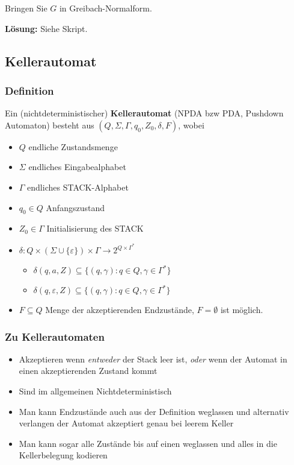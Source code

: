 \documentclass{beamer}
\begin{document}
{\begin{frame}
Bringen Sie $G$ in Greibach-Normalform.

\textbf{Lösung:} Siehe Skript.
\end{frame}

\subsection{Kellerautomat}
\begin{frame}
\frametitle{Definition}
Ein (nichtdeterministischer) \textbf{Kellerautomat} (NPDA bzw PDA, Pushdown Automaton) besteht aus $(Q, \Sigma, \Gamma, q_0, Z_0,\delta, F)$, wobei
\begin{itemize}
\item $Q$ endliche Zustandsmenge
\item $\Sigma$ endliches Eingabealphabet
\item $\Gamma$ endliches STACK-Alphabet
\item $q_0 \in Q$ Anfangszustand
\item $Z_0 \in \Gamma$ Initialisierung des STACK
\item $\delta : Q \times ( \Sigma \cup \{\varepsilon\}) \times \Gamma \rightarrow 2^{Q \times \Gamma^*}$
\begin{itemize}
\item $\delta(q, a, Z) \subseteq \{(q,\gamma) : q \in Q, \gamma \in \Gamma^*\}$
\item $\delta(q, \varepsilon, Z) \subseteq \{(q,\gamma) : q \in Q, \gamma \in \Gamma^*\}$
\end{itemize}
\item $F \subseteq Q$ Menge der akzeptierenden Endzustände, $F=\emptyset$ ist möglich.
\end{itemize}
\end{frame}

\begin{frame}
\frametitle{Zu Kellerautomaten}
\begin{itemize}
\item Akzeptieren wenn \emph{entweder} der Stack leer ist, \emph{oder} wenn der Automat in einen akzeptierenden Zustand kommt
\item Sind im allgemeinen Nichtdeterministisch
\item Man kann Endzustände auch aus der Definition weglassen und alternativ verlangen der Automat akzeptiert genau bei leerem Keller
\item Man kann sogar alle Zustände bis auf einen weglassen und alles in die Kellerbelegung kodieren
\end{itemize}
\end{frame}

}
\end{document}
